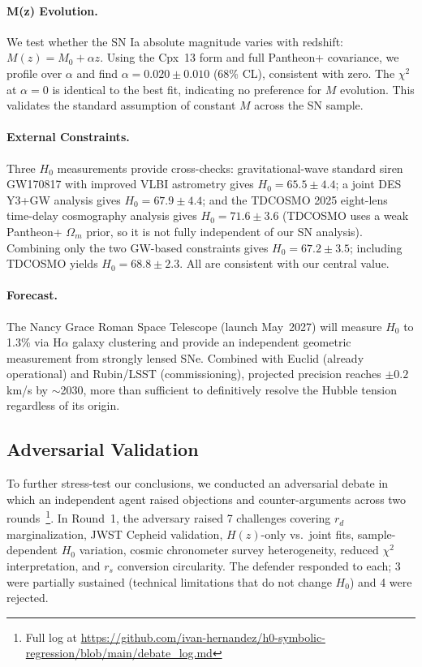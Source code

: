 \documentclass[twocolumn]{aastex631}
\begin{document}
\paragraph{M(z) Evolution.}
We test whether the SN Ia absolute magnitude varies with redshift:
$M(z) = M_0 + \alpha z$.  Using the Cpx~13 form and full Pantheon+
covariance, we profile over $\alpha$ and find $\alpha = 0.020 \pm 0.010$
(68\% CL), consistent with zero.  The $\chi^2$ at $\alpha=0$ is identical
to the best fit, indicating no preference for $M$ evolution.  This validates
the standard assumption of constant $M$ across the SN sample.

\paragraph{External Constraints.}
Three $H_0$ measurements provide cross-checks:
gravitational-wave standard siren GW170817 with improved VLBI astrometry
\cite{gw170817_2026} gives $H_0=65.5\pm4.4$; a joint DES Y3+GW analysis
\cite{des_gw_2026} gives $H_0=67.9\pm4.4$; and the TDCOSMO 2025 eight-lens
time-delay cosmography analysis \cite{tdcosmo2025} gives $H_0=71.6\pm3.6$
(TDCOSMO uses a weak Pantheon+ $\Omega_m$ prior, so it is not fully
independent of our SN analysis).  Combining only the two GW-based constraints
gives $H_0=67.2\pm3.5$; including TDCOSMO yields $H_0=68.8\pm2.3$.
All are consistent with our central value.

\paragraph{Forecast.}
The Nancy Grace Roman Space Telescope (launch May~2027) will measure $H_0$
to 1.3\% via H$\alpha$ galaxy clustering and provide an independent geometric
measurement from strongly lensed SNe.  Combined with Euclid (already
operational) and Rubin/LSST (commissioning), projected precision reaches
$\pm0.2$ km/s by $\sim$2030, more than sufficient to definitively resolve
the Hubble tension regardless of its origin.

\subsection{Adversarial Validation}
\label{sec:adversarial}

To further stress-test our conclusions, we conducted an adversarial debate in
which an independent agent raised objections and counter-arguments across two
rounds~\footnote{Full log at \url{https://github.com/ivan-hernandez/h0-symbolic-regression/blob/main/debate_log.md}}.  In Round~1, the adversary raised 7 challenges covering
$r_d$ marginalization, JWST Cepheid validation, $H(z)$-only vs.\ joint fits,
sample-dependent $H_0$ variation, cosmic chronometer survey heterogeneity,
reduced $\chi^2$ interpretation, and $r_s$ conversion circularity.  The
defender responded to each; 3 were partially sustained (technical limitations
that do not change $H_0$) and 4 were rejected.
\end{document}
